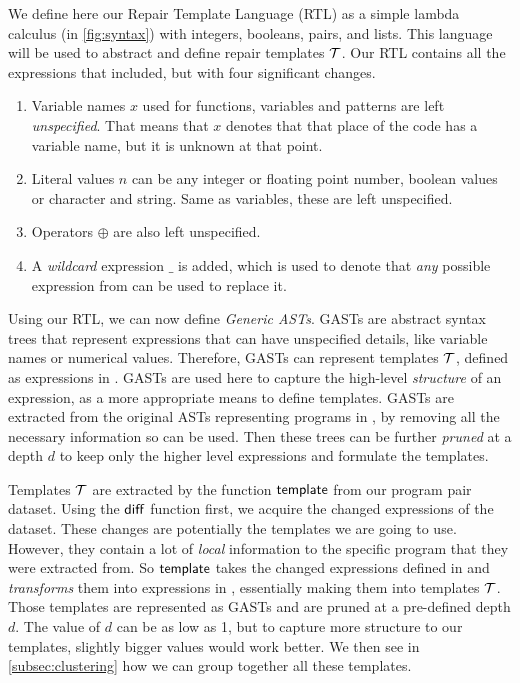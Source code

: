 We define here our Repair Template Language (RTL) as a simple lambda calculus
(\repairLang in \autoref{fig:syntax}) with integers, booleans, pairs, and lists.
This language will be used to abstract and define repair templates $\mathcal{T}$. Our RTL
contains all the expressions that \lang included, but with four significant
changes.

\begin{enumerate}
    \item Variable names $x$ used for functions, variables and patterns are left
    \emph{unspecified}. That means that $x$ denotes that that place of the code
    has a variable name, but it is unknown at that point.
    \item Literal values $n$ can be any integer or floating point number,
    boolean values or character and string. Same as variables, these are left
    unspecified.
    \item Operators $\oplus$ are also left unspecified.
    \item A \emph{wildcard} expression $\_$ is added, which is used to denote
    that \emph{any} possible expression from \repairLang can be used to replace
    it.
\end{enumerate}



Using our RTL, we can now define \emph{Generic ASTs}. GASTs are abstract syntax
trees that represent expressions that can have unspecified details, like
variable names or numerical values. Therefore, GASTs can represent templates
$\mathcal{T}$, defined as expressions in \repairLang. GASTs are used here to capture the
high-level \emph{structure} of an expression, as a more appropriate means to
define templates. GASTs are extracted from the original ASTs representing
programs in \lang, by removing all the necessary information so \repairLang can
be used. Then these trees can be further \emph{pruned} at a depth $d$ to keep
only the higher level expressions and formulate the templates.


Templates $\mathcal{T}$ are extracted by the function $\mathsf{template}$ from our program
pair dataset. Using the $\mathsf{diff}$ function first, we acquire the changed
expressions of the dataset. These changes are potentially the templates we are
going to use. However, they contain a lot of \emph{local} information to the
specific program that they were extracted from. So $\mathsf{template}$ takes the
changed expressions defined in \lang and \emph{transforms} them into expressions
in \repairLang, essentially making them into templates $\mathcal{T}$. Those templates are
represented as GASTs and are pruned at a pre-defined depth $d$. The value of $d$
can be as low as 1, but to capture more structure to our templates, slightly
bigger values would work better. We then see in \autoref{subsec:clustering} how we can group together all these templates.


